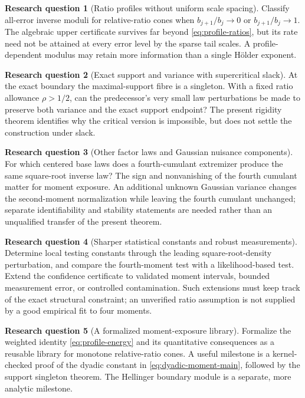 \documentclass[11pt,a4paper]{article}
\numberwithin{equation}{section}
\theoremstyle{definition}
\newtheorem{question}{Research question}
\theoremstyle{remark}
\begin{document}
\begin{question}[Ratio profiles without uniform scale spacing]
Classify all-error inverse moduli for relative-ratio cones when
$b_{j+1}/b_j\to0$ or $b_{j+1}/b_j\to1$. The algebraic upper certificate
survives far beyond \eqref{eq:profile-ratios}, but its rate need not be
attained at every error level by the sparse tail scales. A profile-dependent
modulus may retain more information than a single H\"older exponent.
\end{question}

\begin{question}[Exact support and variance with supercritical slack]
At the exact boundary the maximal-support fibre is a singleton. With a fixed
ratio allowance $\rho>1/2$, can the predecessor's very small law perturbations
be made to preserve both variance and the exact support endpoint? The present
rigidity theorem identifies why the critical version is impossible, but does
not settle the construction under slack.
\end{question}

\begin{question}[Other factor laws and Gaussian nuisance components]
For which centered base laws does a fourth-cumulant extremizer produce the
same square-root inverse law? The sign and nonvanishing of the fourth cumulant
matter for moment exposure. An additional unknown Gaussian variance changes
the second-moment normalization while leaving the fourth cumulant unchanged;
separate identifiability and stability statements are needed rather than an
unqualified transfer of the present theorem.
\end{question}

\begin{question}[Sharper statistical constants and robust measurements]
Determine local testing constants through the leading square-root-density
perturbation, and compare the fourth-moment test with a likelihood-based test.
Extend the confidence certificate to validated moment intervals, bounded
measurement error, or controlled contamination. Such extensions must keep
track of the exact structural constraint; an unverified ratio assumption is
not supplied by a good empirical fit to four moments.
\end{question}

\begin{question}[A formalized moment-exposure library]
Formalize the weighted identity \eqref{eq:profile-energy} and its quantitative
consequences as a reusable library for monotone relative-ratio cones.
A useful milestone is a kernel-checked proof of the dyadic constant in
\eqref{eq:dyadic-moment-main}, followed by the support singleton theorem.
The Hellinger boundary module is a separate, more analytic milestone.
\end{question}
\end{document}
